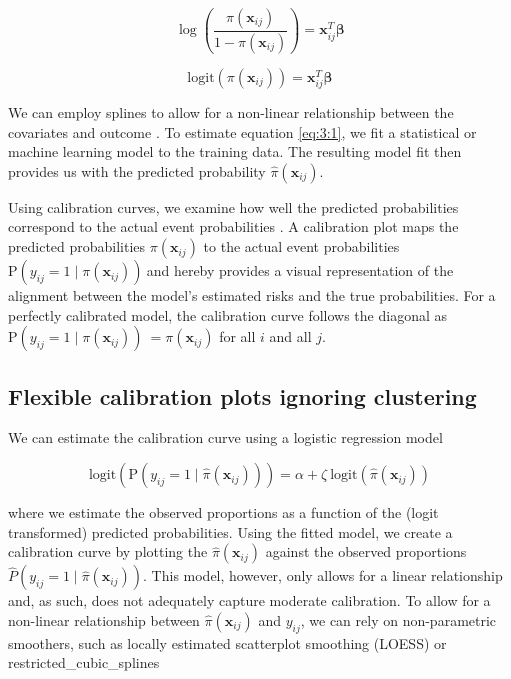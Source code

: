 \[{{\log}\left( \frac{\pi\left( \mathbf{x}_{ij} \right)}{1 - \pi\left( \mathbf{x}_{ij} \right)} \right) = \mathbf{x}_{ij}^{T}\mathbf{\beta}}\]

\[ {\text{logit}\left( \pi\left( \mathbf{x}_{ij} \right) \right)\mathbf{=}\mathbf{x}_{ij}^{T}\mathbf{\beta}}\]

We can employ splines to allow for a non-linear relationship between the covariates and outcome \cite{harrellRegressionModelingStrategies2015}. To estimate equation \ref{eq:3:1}, we fit a statistical or machine learning model to the training data. The resulting model fit then provides us with the predicted probability \(\widehat{\pi}\left( \mathbf{x}_{ij} \right)\).

Using calibration curves, we examine how well the predicted probabilities correspond to the actual event probabilities \cite{steyerbergClinicalPredictionModels2009,vancalsterCalibrationHierarchyRisk2016,dimitriadisHonestCalibrationAssessment2023,decockcampoReliablePredictiveAnalytics2023}. A calibration plot maps the predicted probabilities \({\pi}\left( \mathbf{x}_{ij} \right)\) to the actual event probabilities \(\text{P}\left( y_{ij} = 1\mid{\pi}\left( \mathbf{x}_{ij} \right) \right)\ \)and hereby provides a visual representation of the alignment between the model's estimated risks and the true probabilities. For a perfectly calibrated model, the calibration curve follows the diagonal as \(\text{P}\left( y_{ij} = 1\mid{\pi}\left( \mathbf{x}_{ij} \right) \right)\  = \pi\left( \mathbf{x}_{ij} \right)\) for all \(i\) and all \(j\).

\subsection{Flexible calibration plots ignoring clustering}
We can estimate the calibration curve using a logistic regression model \cite{decockcampoReliablePredictiveAnalytics2023,onbehalfoftopicgroupevaluatingdiagnostictestsandpredictionmodelsofthestratosinitiativeCalibrationAchillesHeel2019,coxTwoFurtherApplications1958}

\[\text{logit}\left( \text{P}\left( y_{ij} = 1\mid\widehat{\pi}\left( \mathbf{x}_{ij} \right) \right) \right)\mathbf{=}\alpha + \zeta\ \text{logit}\left( \widehat{\pi}\left( \mathbf{x}_{ij} \right) \right)\]

where we estimate the observed proportions as a function of the (logit transformed) predicted probabilities. Using the fitted model, we create a calibration curve by plotting the \(\widehat{\pi}\left( \mathbf{x}_{ij} \right)\) against the observed proportions \(\widehat{P}\left( y_{ij} = 1\mid\widehat{\pi}\left( \mathbf{x}_{ij} \right) \right)\). This model, however, only allows for a linear relationship and, as such, does not adequately capture moderate calibration. To allow for a non-linear relationship between \(\widehat{\pi}\left( \mathbf{x}_{ij} \right)\) and \(y_{ij}\), we can rely on non-parametric smoothers, such as locally estimated scatterplot smoothing (LOESS) or \gls{restricted_cubic_splines}

